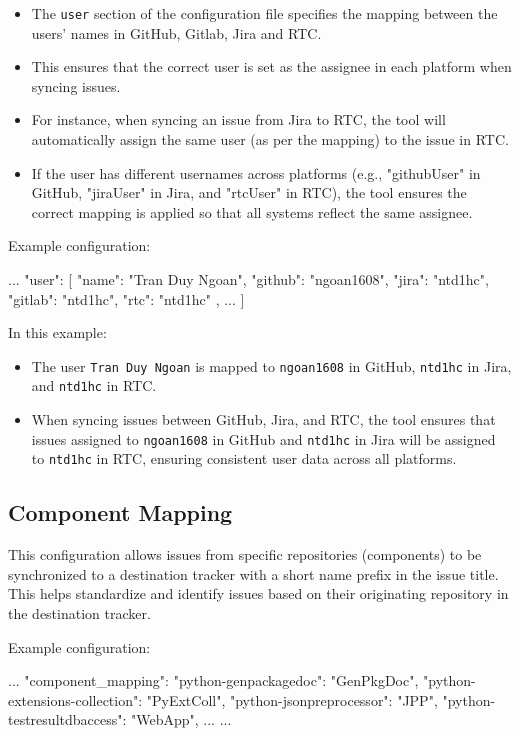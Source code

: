 \begin{itemize}
   \item The \texttt{user} section of the configuration file specifies the
         mapping between the users' names in GitHub, Gitlab, Jira and RTC.
   \item This ensures that the correct user is set as the assignee in each
         platform when syncing issues.
   \item For instance, when syncing an issue from Jira to RTC, the tool will
         automatically assign the same user (as per the mapping) to the issue in RTC.
   \item If the user has different usernames across platforms
         (e.g., "githubUser" in GitHub, "jiraUser" in Jira, and "rtcUser" in RTC),
         the tool ensures the correct mapping is applied so that all systems
         reflect the same assignee.
\end{itemize}

Example configuration:
\begin{pythoncode}
{
   ...
   "user": [
      {
         "name": "Tran Duy Ngoan",
         "github": "ngoan1608",
         "jira": "ntd1hc",
         "gitlab": "ntd1hc",
         "rtc": "ntd1hc"
      },
      ...
   ]
}
\end{pythoncode}

In this example:
\begin{itemize}
    \item The user \texttt{Tran Duy Ngoan} is mapped to \texttt{ngoan1608} in
          GitHub, \texttt{ntd1hc} in Jira, and \texttt{ntd1hc} in RTC.
    \item When syncing issues between GitHub, Jira, and RTC, the tool ensures
          that issues assigned to \texttt{ngoan1608} in GitHub and
          \texttt{ntd1hc} in Jira will be assigned to \texttt{ntd1hc} in RTC,
          ensuring consistent user data across all platforms.
\end{itemize}

\subsection{Component Mapping}
This configuration allows issues from specific repositories (components) to be
synchronized to a destination tracker with a short name prefix in the issue
title.
This helps standardize and identify issues based on their originating repository
in the destination tracker.

Example configuration:
\begin{pythoncode}
{
   ...
   "component_mapping": {
      "python-genpackagedoc": "GenPkgDoc",
      "python-extensions-collection": "PyExtColl",
      "python-jsonpreprocessor": "JPP",
      "python-testresultdbaccess": "WebApp",
      ...
   }
   ...
}
\end{pythoncode}

